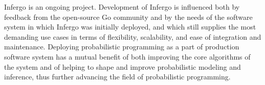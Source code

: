 \documentclass[sigplan,review,10pt,anonymous]{acmart}
\begin{document}
\begin{sloppypar}
Infergo is an ongoing project. Development of Infergo is
influenced both by feedback from the open-source Go community
and by the needs of the software system in which Infergo was
initially deployed, and which still supplies the most demanding
use cases in terms of flexibility, scalability, and ease of
integration and maintenance. Deploying probabilistic programming
as a part of production software system has a mutual benefit of
both improving the core algorithms of the system and of helping
to shape and improve probabilistic modeling and inference, thus
further advancing the field of probabilistic programming.

\end{sloppypar}


\clearpage
\clearpage


\end{document}
